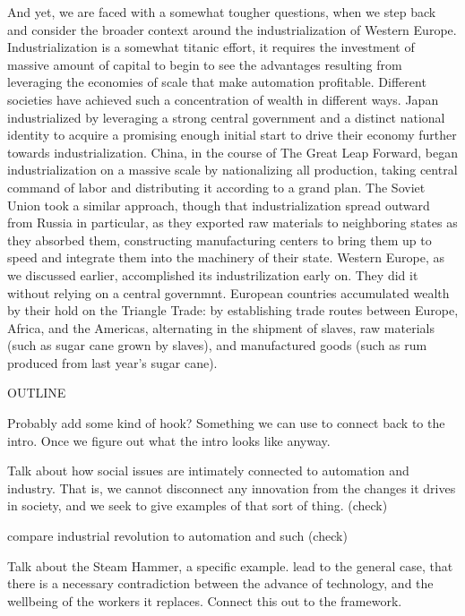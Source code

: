 And yet, we are faced with a somewhat tougher questions, when we step 
back and consider the broader context around the industrialization of 
Western Europe.  Industrialization is a somewhat titanic effort, it 
requires the investment of massive amount of capital to begin to see 
the advantages resulting from leveraging the economies of scale that 
make automation profitable.  Different societies have achieved such 
a concentration of wealth in different ways.  Japan industrialized by 
leveraging a strong central government and a distinct national 
identity to acquire a promising enough initial start to drive their 
economy further towards industrialization.  China, in the course of 
The Great Leap Forward, began industrialization on a massive scale by 
nationalizing all production, taking central command of labor and 
distributing it according to a grand plan.  The Soviet Union took a 
similar approach, though that industrialization spread outward from 
Russia in particular, as they exported raw materials to neighboring 
states as they absorbed them, constructing manufacturing centers to 
bring them up to speed and integrate them into the machinery of their 
state.  Western Europe, as we discussed earlier, accomplished its 
industrilization early on.  They did it without relying on a central 
governmnt.  European countries accumulated wealth by their hold on 
the Triangle Trade: by establishing trade 
routes between Europe, Africa, and the Americas, alternating in the 
shipment of slaves, raw materials (such as sugar cane grown by slaves), 
and manufactured goods (such as rum produced from last year's sugar 
cane).  

 

{\large OUTLINE}

Probably add some kind of hook?  Something we can use to connect 
back to the intro.  Once we figure out what the intro looks like 
anyway.

Talk about how social issues are intimately connected to automation 
and industry.  That is, we cannot disconnect any innovation from the 
changes it drives in society, and we seek to give examples of that sort 
of thing. (check)

compare industrial revolution to automation and such (check)

Talk about the Steam Hammer, a specific example.  lead to the general 
case, that there is a necessary contradiction between the advance of 
technology, and the wellbeing of the workers it replaces.  Connect 
this out to the framework.

